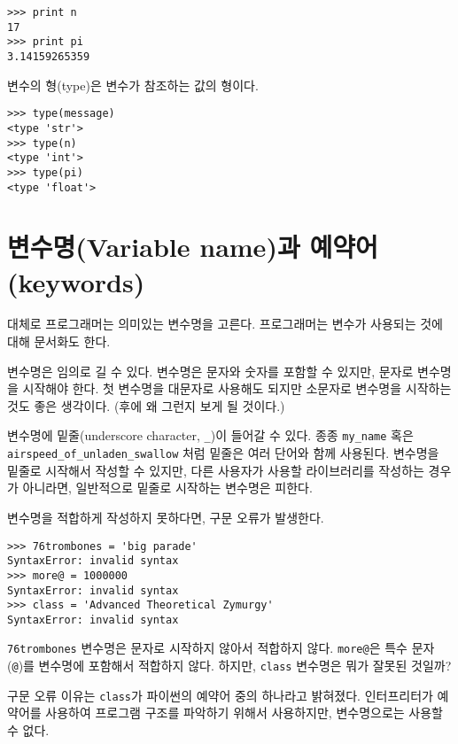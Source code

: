 \beforeverb
\begin{verbatim}
>>> print n
17
>>> print pi
3.14159265359
\end{verbatim}
\afterverb
%

변수의 형(type)은 변수가 참조하는 값의 형이다.

\beforeverb
\begin{verbatim}
>>> type(message)
<type 'str'>
>>> type(n)
<type 'int'>
>>> type(pi)
<type 'float'>
\end{verbatim}
\afterverb
%

\section{변수명(Variable name)과 예약어(keywords)}

대체로 프로그래머는 의미있는 변수명을 고른다. 프로그래머는 변수가 사용되는 것에 대해 문서화도 한다.

변수명은 임의로 길 수 있다. 변수명은 문자와 숫자를 포함할 수 있지만, 문자로 변수명을 시작해야 한다. 첫 변수명을 대문자로 사용해도 되지만 소문자로 변수명을 시작하는 것도 좋은 생각이다. (후에 왜 그런지 보게 될 것이다.)

변수명에 밑줄(underscore character, \verb"_")이 들어갈 수 있다. 종종 \verb"my_name" 혹은 \verb"airspeed_of_unladen_swallow" 처럼 밑줄은 여러 단어와 함께 사용된다.
변수명을 밑줄로 시작해서 작성할 수 있지만, 다른 사용자가 사용할 라이브러리를 작성하는 경우가 아니라면, 일반적으로 밑줄로 시작하는 변수명은 피한다.


변수명을 적합하게 작성하지 못하다면, 구문 오류가 발생한다.

\beforeverb
\begin{verbatim}
>>> 76trombones = 'big parade'
SyntaxError: invalid syntax
>>> more@ = 1000000
SyntaxError: invalid syntax
>>> class = 'Advanced Theoretical Zymurgy'
SyntaxError: invalid syntax
\end{verbatim}
\afterverb
%

{\tt 76trombones} 변수명은 문자로 시작하지 않아서 적합하지 않다. 
{\tt more@}은 특수 문자 ({\tt @})를 변수명에 포함해서 적합하지 않다. 
하지만, {\tt class} 변수명은 뭐가 잘못된 것일까?

구문 오류 이유는 {\tt class}가 파이썬의 예약어 중의 하나라고 밝혀졌다. 
인터프리터가 예약어를 사용하여 프로그램 구조를 파악하기 위해서 사용하지만, 변수명으로는 사용할 수 없다.


